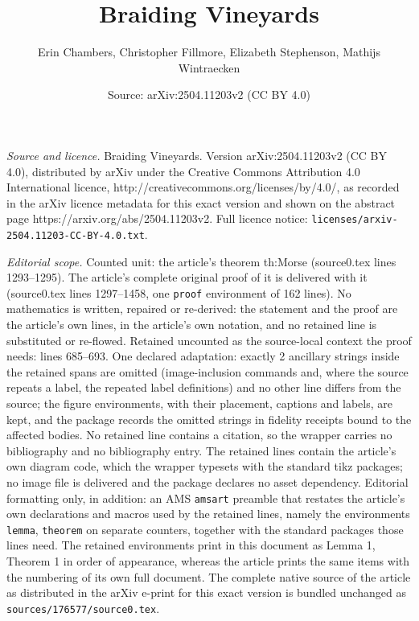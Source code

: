 \documentclass[10pt,a4paper]{amsart}
\title{Braiding Vineyards}
\author{Erin Chambers, Christopher Fillmore, Elizabeth Stephenson, Mathijs Wintraecken}
\date{Source: arXiv:2504.11203v2 (CC BY 4.0)}
\begin{document}
\maketitle

\noindent\emph{Source and licence.} Braiding Vineyards. Version arXiv:2504.11203v2 (CC BY 4.0), distributed by arXiv under the Creative Commons Attribution 4.0 International licence, http://creativecommons.org/licenses/by/4.0/, as recorded in the arXiv licence metadata for this exact version and shown on the abstract page https://arxiv.org/abs/2504.11203v2. Full licence notice: \texttt{licenses/arxiv-2504.11203-CC-BY-4.0.txt}.\par\smallskip

\noindent\textit{Editorial scope.} Counted unit: the article's theorem th:Morse (source0.tex lines 1293--1295). The article's complete original proof of it is delivered with it (source0.tex lines 1297--1458, one \texttt{proof} environment of 162 lines). No mathematics is written, repaired or re-derived: the statement and the proof are the article's own lines, in the article's own notation, and no retained line is substituted or re-flowed.  Retained uncounted as the source-local context the proof needs: lines 685--693.  One declared adaptation: exactly 2 ancillary strings inside the retained spans are omitted (image-inclusion commands and, where the source repeats a label, the repeated label definitions) and no other line differs from the source; the figure environments, with their placement, captions and labels, are kept, and the package records the omitted strings in fidelity receipts bound to the affected bodies.  No retained line contains a citation, so the wrapper carries no bibliography and no bibliography entry.  The retained lines contain the article's own diagram code, which the wrapper typesets with the standard tikz packages; no image file is delivered and the package declares no asset dependency.  Editorial formatting only, in addition: an AMS \texttt{amsart} preamble that restates the article's own declarations and macros used by the retained lines, namely the environments \texttt{lemma}, \texttt{theorem} on separate counters, together with the standard packages those lines need.  The retained environments print in this document as Lemma 1, Theorem 1 in order of appearance, whereas the article prints the same items with the numbering of its own full document.  The complete native source of the article as distributed in the arXiv e-print for this exact version is bundled unchanged as \texttt{sources/176577/source0.tex}.
\end{document}
